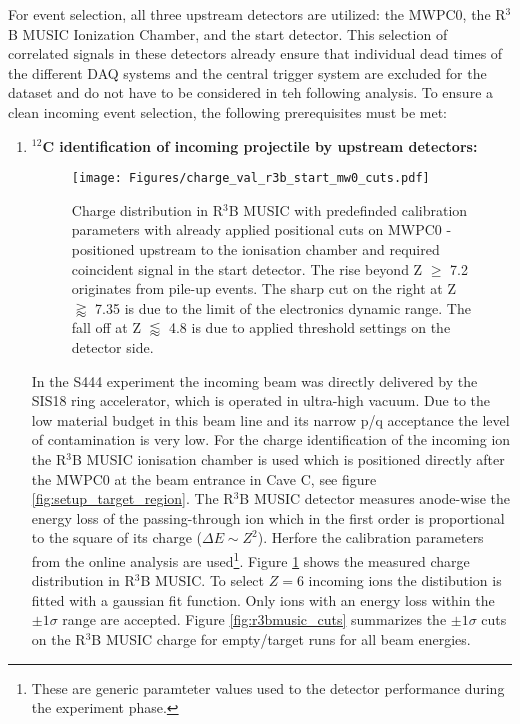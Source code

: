 For event selection, all three upstream detectors are utilized: the MWPC0, the R$^3$B MUSIC Ionization Chamber, and the start detector. This selection of correlated signals in these detectors already ensure that individual dead times of the different DAQ systems and the central trigger system are excluded for the dataset and do not have to be considered in teh following analysis. To ensure a clean incoming event selection, the following prerequisites must be met:
\begin{enumerate}
\item \textbf{$^{12}$C identification of incoming projectile by upstream detectors:}\newline
\begin{figure}[htpb]
    \centering
    \texttt{[image: Figures/charge\_val\_r3b\_start\_mw0\_cuts.pdf]}
    \caption{
    Charge distribution in R$^3$B MUSIC with predefinded calibration parameters with already applied positional cuts on MWPC0 - positioned upstream to the ionisation chamber and required coincident signal in the start detector. The rise beyond Z $\ge$ 7.2 originates from pile-up events. The sharp cut on the right at Z $\gtrapprox$ 7.35 is due to the limit of the electronics dynamic range. The fall off at Z $\lessapprox$ 4.8 is due to applied threshold settings on the detector side.
    }
    \label{fig:r3bmusic_charge}
\end{figure}
In the S444 experiment the incoming beam was directly delivered by the SIS18 ring accelerator, which is operated in ultra-high vacuum. Due to the low material budget in this beam line and its narrow p/q acceptance the level of contamination is very low.\newline 
For the charge identification of the incoming ion the R$^3$B MUSIC ionisation chamber is used which is positioned directly after the MWPC0 at the beam entrance in Cave C, see figure \ref{fig:setup_target_region}. The R$^3$B MUSIC detector measures anode-wise the energy loss of the passing-through ion which in the first order is proportional to the square of its charge ($\Delta E \sim Z^{2}$). Herfore the calibration parameters from the online analysis are used\footnote{These are generic paramteter values used to the detector performance during the experiment phase.}. Figure \ref{fig:r3bmusic_charge} shows the measured charge distribution in R$^3$B MUSIC. To select $Z = 6$ incoming ions the distibution is fitted with a gaussian fit function. Only ions with an energy loss within the $\pm 1 \sigma$ range are accepted. Figure \ref{fig:r3bmusic_cuts} summarizes the $\pm 1 \sigma$ cuts on the R$^3$B MUSIC charge for empty/target runs for all beam energies.   

\end{enumerate}
